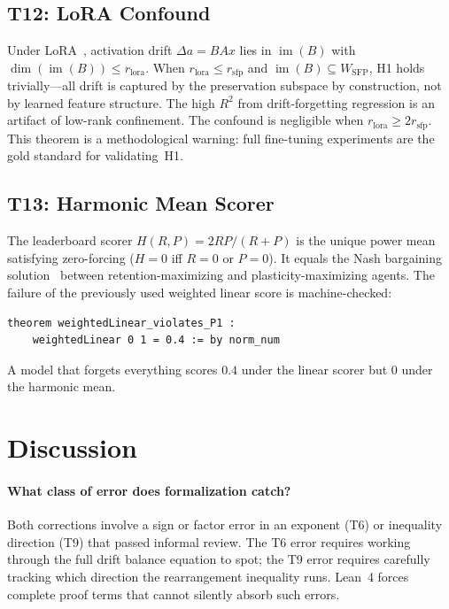 \documentclass[11pt,a4paper]{article}
\theoremstyle{definition}
\DeclareMathOperator{\im}{im}
\begin{document}
\subsection{T12: LoRA Confound}

Under LoRA~\citep{hu2022lora}, activation drift $\Delta a = BAx$ lies in $\im(B)$ with $\dim(\im(B)) \leq r_{\mathrm{lora}}$. When $r_{\mathrm{lora}} \leq r_{\mathrm{sfp}}$ and $\im(B) \subseteq W_{\mathrm{SFP}}$, H1 holds trivially---all drift is captured by the preservation subspace by construction, not by learned feature structure. The high $R^2$ from drift-forgetting regression is an artifact of low-rank confinement. The confound is negligible when $r_{\mathrm{lora}} \geq 2r_{\mathrm{sfp}}$. This theorem is a methodological warning: full fine-tuning experiments are the gold standard for validating~H1.

\subsection{T13: Harmonic Mean Scorer}

The leaderboard scorer $H(R, P) = 2RP/(R+P)$ is the unique power mean satisfying zero-forcing ($H = 0$ iff $R = 0$ or $P = 0$). It equals the Nash bargaining solution~\citep{nash1950} between retention-maximizing and plasticity-maximizing agents. The failure of the previously used weighted linear score is machine-checked:

\begin{lstlisting}[style=lean]
theorem weightedLinear_violates_P1 :
    weightedLinear 0 1 = 0.4 := by norm_num
\end{lstlisting}

A model that forgets everything scores $0.4$ under the linear scorer but $0$ under the harmonic mean.

\section{Discussion}
\label{sec:discussion}

\paragraph{What class of error does formalization catch?} Both corrections involve a sign or factor error in an exponent (T6) or inequality direction (T9) that passed informal review. The T6 error requires working through the full drift balance equation to spot; the T9 error requires carefully tracking which direction the rearrangement inequality runs. Lean~4 forces complete proof terms that cannot silently absorb such errors.
\end{document}
